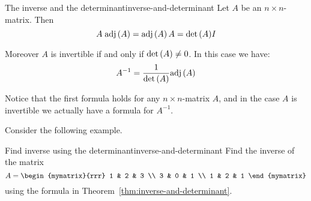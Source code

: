 \begin{theorem}{The inverse and the determinant}{inverse-and-determinant}
Let $A$ be an  $n\times n$-matrix. Then  
\begin{equation*}
A \; \mbox{\rm adj}\left(A\right) = \mbox{\rm adj}\left(A\right)A = {\det \left(A\right)} I
\end{equation*}

Moreover $A$ is invertible if and only if  $\det \left(A\right) \neq 0$. In this case we have: 
\begin{equation*}
A^{-1} = \frac{1}{\det \left(A\right)}  \mbox{\rm adj}\left(A\right)
\end{equation*}
\end{theorem}


Notice that the first formula holds for any $n \times n$-matrix $A$, and in the case $A$ is invertible we actually have a formula for $A^{-1}$.

Consider the following example.

\begin{example}{Find inverse using the determinant}{inverse-and-determinant}
Find the inverse of the matrix
\begin{equation*}
A=\begin{mymatrix}{rrr}
1 & 2 & 3 \\
3 & 0 & 1 \\
1 & 2 & 1
\end{mymatrix}
\end{equation*}
using the formula in Theorem~\ref{thm:inverse-and-determinant}.
\end{example}


